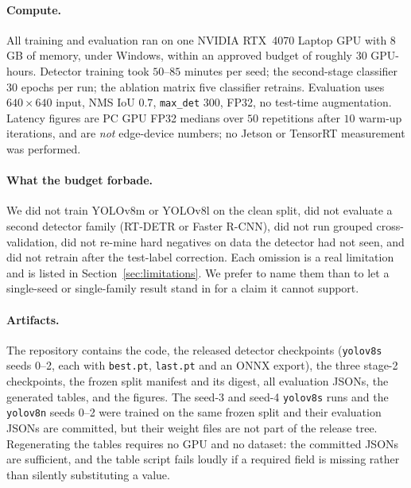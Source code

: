 \paragraph{Compute.} All training and evaluation ran on one NVIDIA RTX~4070
Laptop GPU with $8$\,GB of memory, under Windows, within an approved budget of
roughly $30$ GPU-hours. Detector training took $50$--$85$ minutes per seed;
the second-stage classifier $30$ epochs per run; the ablation matrix five
classifier retrains. Evaluation uses $640\times640$ input, NMS IoU $0.7$,
\texttt{max\_det} $300$, FP32, no test-time augmentation. Latency figures are PC
GPU FP32 medians over $50$ repetitions after $10$ warm-up iterations, and are
\emph{not} edge-device numbers; no Jetson or TensorRT measurement was performed.

\paragraph{What the budget forbade.} We did not train YOLOv8m or YOLOv8l on the
clean split, did not evaluate a second detector family (RT-DETR or Faster
R-CNN), did not run grouped cross-validation, did not re-mine hard negatives on
data the detector had not seen, and did not retrain after the test-label
correction. Each omission is a real limitation and is listed in
Section~\ref{sec:limitations}. We prefer to name them than to let a single-seed
or single-family result stand in for a claim it cannot support.

\paragraph{Artifacts.} The repository contains the code, the released detector
checkpoints (\texttt{yolov8s} seeds 0--2, each with \texttt{best.pt},
\texttt{last.pt} and an ONNX export), the three stage-2 checkpoints, the frozen
split manifest and its digest, all evaluation JSONs, the generated tables, and the
figures. The seed-3 and seed-4 \texttt{yolov8s} runs and the \texttt{yolov8n}
seeds 0--2 were trained on the same frozen split and their evaluation JSONs are
committed, but their weight files are not part of the release tree.
Regenerating the tables requires no GPU and no dataset: the committed JSONs are
sufficient, and the table script fails loudly if a required field is missing
rather than silently substituting a value.
